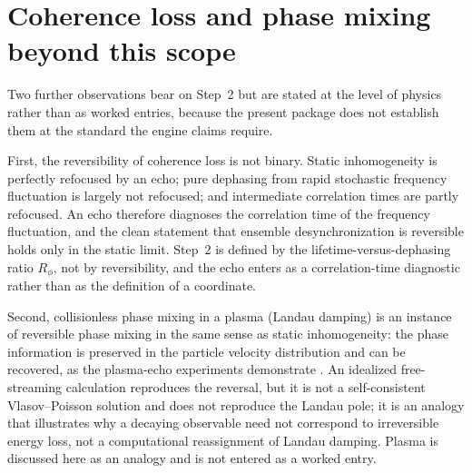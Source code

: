 \section{Coherence loss and phase mixing beyond this scope}

Two further observations bear on Step~2 but are stated at the level of physics rather than as worked entries, because the present package does not establish them at the standard the engine claims require.

First, the reversibility of coherence loss is not binary. Static inhomogeneity is perfectly refocused by an echo; pure dephasing from rapid stochastic frequency fluctuation is largely not refocused; and intermediate correlation times are partly refocused. An echo therefore diagnoses the correlation time of the frequency fluctuation, and the clean statement that ensemble desynchronization is reversible holds only in the static limit. Step~2 is defined by the lifetime-versus-dephasing ratio $R_\phi$, not by reversibility, and the echo enters as a correlation-time diagnostic rather than as the definition of a coordinate.

Second, collisionless phase mixing in a plasma (Landau damping) is an instance of reversible phase mixing in the same sense as static inhomogeneity: the phase information is preserved in the particle velocity distribution and can be recovered, as the plasma-echo experiments demonstrate \citep{gould1967,malmberg1968}. An idealized free-streaming calculation reproduces the reversal, but it is not a self-consistent Vlasov--Poisson solution and does not reproduce the Landau pole; it is an analogy that illustrates why a decaying observable need not correspond to irreversible energy loss, not a computational reassignment of Landau damping. Plasma is discussed here as an analogy and is not entered as a worked entry.
